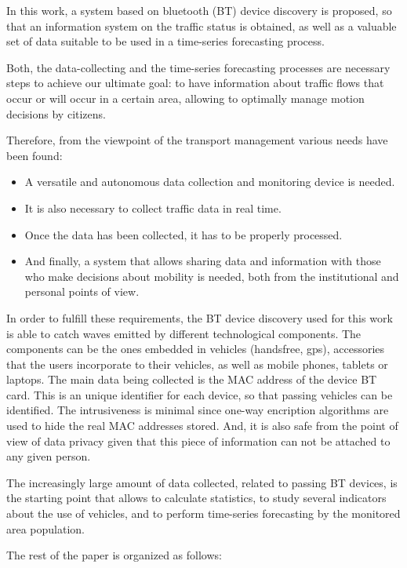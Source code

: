 \documentclass[preprint,authoryear,12pt]{elsarticle}
\begin{document}
In this work, a system based on bluetooth (BT) device discovery is proposed, so that an information system on the traffic status is obtained, as well as a valuable set of data suitable to be used in a time-series forecasting process.

Both, the data-collecting and the time-series forecasting processes are necessary steps to achieve our ultimate goal: to have information about traffic flows that occur or will occur in a certain area, allowing to optimally manage motion decisions by citizens.

Therefore, from the viewpoint of the transport management various needs have been found:

\begin{itemize}
  \item A versatile and autonomous data collection and monitoring device is needed.
  \item It is also necessary to collect traffic data in real time.
  \item Once the data has been collected, it has to be properly processed.
  \item And finally, a system that allows sharing data and information with those who make decisions about mobility is needed, both from the institutional and personal points of view.
\end{itemize}

In order to fulfill these requirements, the BT device discovery used for this work is able to catch waves emitted by different technological components. The components can be the ones embedded in vehicles (handsfree, gps), accessories that the users incorporate to their vehicles, as well as mobile phones, tablets or laptops.
The main data being collected is the MAC address of the device BT card.
This is an unique identifier for each device, so that passing vehicles can be identified.
The intrusiveness is minimal since one-way encription algorithms are used to hide the real MAC addresses stored. And, it is also safe from the point of view of data privacy given that this piece of information can not be attached to any given person.

The increasingly large amount of data collected, related to passing BT devices, is the starting point that allows to calculate statistics, to study several indicators about the use of vehicles, and to perform time-series forecasting by the monitored area population.

The rest of the paper is organized as follows:
\end{document}
